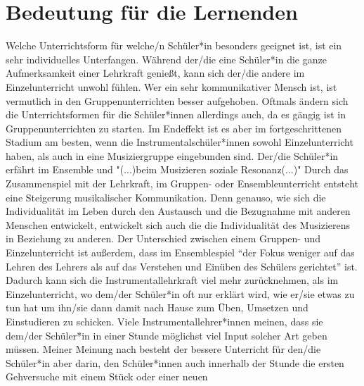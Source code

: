 

\section{Bedeutung für die Lernenden}

Welche Unterrichtsform für welche/n Schüler*in besonders geeignet ist, ist ein
sehr individuelles Unterfangen. Während der/die eine Schüler*in die ganze
Aufmerksamkeit einer Lehrkraft genießt, kann sich der/die andere im
Einzelunterricht unwohl fühlen. Wer ein sehr kommunikativer Mensch ist, ist
vermutlich in den Gruppenunterrichten besser aufgehoben. Oftmals ändern sich die
Unterrichtsformen für die Schüler*innen allerdings auch, da es gängig ist in
Gruppenunterrichten zu starten. Im Endeffekt ist es aber im fortgeschrittenen
Stadium am besten, wenn die Instrumentalschüler*innen sowohl Einzelunterricht
haben, als auch in eine Musiziergruppe eingebunden sind. Der/die Schüler*in
erfährt im Ensemble und "(...)beim Musizieren soziale Resonanz(...)"
\autocite[28]{mitzscherlich:musikpsychologie} Durch das Zusammenspiel mit der
Lehrkraft, im Gruppen- oder Ensembleunterricht entsteht eine Steigerung
musikalischer Kommunikation. \autocite[99]{mitzscherlich:musikpsychologie} Denn
genauso, wie sich die Individualität im Leben durch den Austausch und die
Bezugnahme mit anderen Menschen entwickelt, entwickelt sich auch die die
Individualität des Musizierens in Beziehung zu anderen. Der Unterschied zwischen
einem Gruppen- und Einzelunterricht ist außerdem, dass im Ensemblespiel
\enquote{der Fokus weniger auf das Lehren des Lehrers als auf das Verstehen und
Einüben des Schülers gerichtet} ist.
\autocite[31]{losert:die_kunst_zu_unterrichten} Dadurch kann sich die
Instrumentallehrkraft viel mehr zurücknehmen, als im Einzelunterricht, wo
dem/der Schüler*in oft nur erklärt wird, wie er/sie etwas zu tun hat um ihn/sie
dann damit nach Hause zum Üben, Umsetzen und Einstudieren zu schicken. Viele
Instrumentallehrer*innen meinen, dass sie dem/der Schüler*in in einer Stunde
möglichst viel Input solcher Art geben müssen. Meiner Meinung nach besteht der
bessere Unterricht für den/die Schüler*in aber darin, den Schüler*innen auch
innerhalb der Stunde die ersten Gehversuche mit einem Stück oder einer neuen
